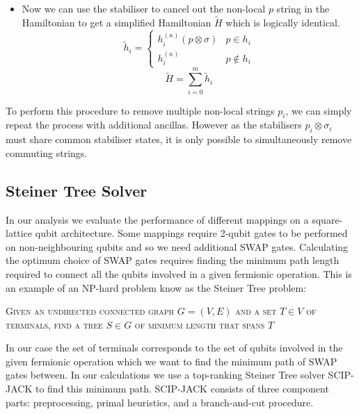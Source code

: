 \documentclass[pdftex,pra,aps,twocolumn,twoside]{revtex4-1}
\theoremstyle{plain}
\theoremstyle{note}
\newcommand\+{{\footnotesize \raisebox{0.3ex}{+}}}
\begin{document}
\begin{itemize}
\begin{equation}
    \label{eq:equivalent_to_original_hamiltonian}
    H^{(\kappa)}\ket{\tilde \psi}_{SA} = V (H \otimes I) \ket{\psi}_S \ket{0}_A
\end{equation}
\item Now we can use the stabiliser to cancel out the non-local $p$ string in the Hamiltonian to get a simplified Hamiltonian $\tilde H$ which is logically identical.
\begin{equation}
   \tilde h_i = \begin{cases} h_i^{(\kappa)} (p \otimes \sigma)  &  p \in h_i \\ 
   h_i^{(\kappa)} & p \notin h_i \end{cases}
\end{equation}
\begin{equation}
    \tilde H = \sum_{i=0}^m \tilde h_i
\end{equation}
\end{itemize}
To perform this procedure to remove multiple non-local strings $p_i$, we can simply repeat the process with additional ancillas. However as the stabilisers $p_i \otimes \sigma_i$ must share common stabiliser states, it is only possible to simultaneously remove commuting strings. 
\subsection{Steiner Tree Solver}
\label{section:SCIPJACK}
In our analysis we evaluate the performance of different mappings on a square-lattice qubit architecture. Some mappings require 2-qubit gates to be performed on non-neighbouring qubits and so we need additional SWAP gates. Calculating the optimum choice of SWAP gates requires finding the minimum path length required to connect all the qubits involved in a given fermionic operation. This is an example of an NP-hard problem know as the Steiner Tree problem:

\begin{algorithm}[h]
\centering
\caption*{\label{alg:steinerTree}\textsc{Steiner Tree Problem}}
\begin{algorithmic}
\State \textsc{Given an undirected connected graph $G = (V,E)$ and a set $T \in V$ of terminals, find a tree $S \in G$ of minimum length that spans $T$}
\end{algorithmic}
\end{algorithm}

In our case the set of terminals corresponds to the set of qubits involved in the given fermionic operation which we want to find the minimum path of SWAP gates between. In our calculations we use a top-ranking Steiner Tree solver SCIP-JACK \cite{rehfeldt2021implications} to find this minimum path.  SCIP-JACK consists of three component parts: preprocessing, primal heuristics, and a branch-and-cut procedure.
\end{document}
